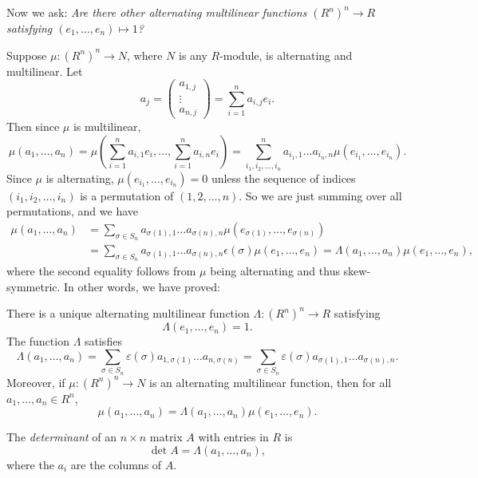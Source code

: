 Now we ask: \emph{Are there other alternating
multilinear functions $(R^n)^n \to R$
satisfying $(e_1, \dots, e_n) \mapsto 1$?}

Suppose $\mu : (R^n)^n \to N$, where $N$ is any
$R$-module, is alternating and multilinear. Let
\[
  a_j =
  \begin{pmatrix}
    a_{1, j} \\
    \vdots \\
    a_{n, j}
  \end{pmatrix}
  = \sum_{i = 1}^n a_{i, j} e_i.
\]
Then since $\mu$ is multilinear,
\[
  \mu(a_1, \dots, a_n) = \mu\left(\sum_{i = 1}^n a_{i, 1} e_i, \dots, \sum_{i = 1}^n a_{i, n} e_i\right)
  = \sum_{i_1, i_2, \dots, i_n}^n a_{i_1, 1} \dots a_{i_n, n} \mu(e_{i_1}, \dots, e_{i_n}).
\]
Since $\mu$ is alternating, $\mu(e_{i_1}, \dots, e_{i_n}) = 0$
unless the sequence of indices
$(i_1, i_2, \dots, i_n)$ is a permutation
of $(1, 2, \dots, n)$. So we are just summing over
all permutations, and we have
\begin{align*}
  \mu(a_1, \dots, a_n)
  &= \sum_{\sigma \in S_n} a_{\sigma(1), 1} \dots a_{\sigma(n), n} \mu(e_{\sigma(1)}, \dots, e_{\sigma(n)}) \\
  &= \sum_{\sigma \in S_n} a_{\sigma(1), 1} \dots a_{\sigma(n), n} \epsilon(\sigma)\mu(e_1, \dots, e_n)
  = \Lambda(a_1, \dots, a_n) \mu(e_1, \dots, e_n),
\end{align*}
where the second equality follows from $\mu$ being
alternating and thus skew-symmetric. In other words,
we have proved:

\begin{theorem}
  There is a unique alternating multilinear function
  $\Lambda : (R^n)^n \to R$ satisfying
  \[\Lambda(e_1, \dots, e_n) = 1.\]
  The function $\Lambda$ satisfies
  \[
    \Lambda(a_1, \dots, a_n)
    = \sum_{\sigma \in S_n} \varepsilon(\sigma) a_{1, \sigma(1)} \dots a_{n, \sigma(n)}
    = \sum_{\sigma \in S_n} \varepsilon(\sigma) a_{\sigma(1), 1} \dots a_{\sigma(n), n}.
  \]
  Moreover, if $\mu : (R^n)^n \to N$ is an
  alternating multilinear function, then
  for all $a_1, \dots, a_n \in R^n$,
  \[
    \mu(a_1, \dots, a_n) = \Lambda(a_1, \dots, a_n) \mu(e_1, \dots, e_n).
  \]
\end{theorem}

\begin{definition}
  The \emph{determinant} of an $n \times n$ matrix
  $A$ with entries in $R$ is
  \[
    \det A = \Lambda(a_1, \dots, a_n),
  \]
  where the $a_i$ are the columns of $A$.
\end{definition}

